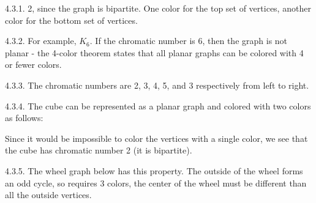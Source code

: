  \protect {} \protect \begin {itemize} 
\begin{ans}{4.3.1.}
		2, since the graph is bipartite.  One color for the top set of vertices, another color for the bottom set of vertices.  %
	
\end{ans}
\begin{ans}{4.3.2.}
		For example, $K_6$.  If the chromatic number is 6, then the graph is not planar - the 4-color theorem states that all planar graphs can be colored with 4 or fewer colors. %
	
\end{ans}
\begin{ans}{4.3.3.}
		The chromatic numbers are 2, 3, 4, 5, and 3 respectively from left to right. %
	
\end{ans}
\begin{ans}{4.3.4.}
		The cube can be represented as a planar graph and colored with two colors as follows:

		\begin{center}
		\end{center}

		Since it would be impossible to color the vertices with a single color, we see that the cube has chromatic number 2 (it is bipartite).
	
\end{ans}
\begin{ans}{4.3.5.}
		The wheel graph below has this property.  The outside of the wheel forms an odd cycle, so requires 3 colors, the center of the wheel must be different than all the outside vertices.


\end{ans}
\end{itemize}

